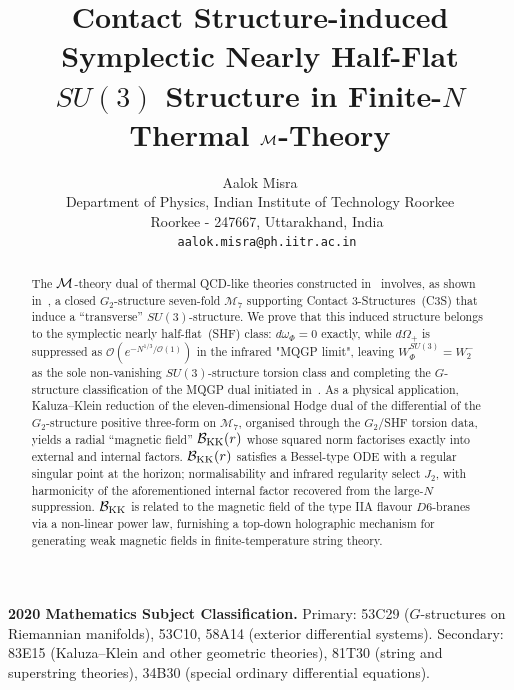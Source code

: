 \documentclass[a4paper,11pt,fleqn]{article}
\theoremstyle{plain}
\theoremstyle{definition}
\begin{document}
\title{Contact Structure-induced Symplectic Nearly Half-Flat $SU(3)$ Structure in Finite-$N$ Thermal ${\cal M}$-Theory}
\author{Aalok Misra\\
Department of Physics, Indian Institute of Technology Roorkee \\
	~~Roorkee - 247667, Uttarakhand, India\\
	~~{\tt aalok.misra@ph.iitr.ac.in}}
\date{}
\maketitle
\noindent

\begin{abstract}
The ${\cal M}$-theory dual of thermal QCD-like theories constructed in~\cite{MQGP,OR4}
involves, as shown in~\cite{ACMS}, a closed $G_2$-structure seven-fold $\mathcal{M}_7$
supporting Contact 3-Structures~(C3S) that induce a ``transverse'' $SU(3)$-structure. We prove that this induced structure belongs to the symplectic nearly half-flat~(SHF)
class: $d\omega_\Phi=0$ exactly, while $d\Omega_+$ is suppressed as
$\mathcal{O}(e^{-N^{1/3}/\mathcal{O}(1)})$ in the infrared "MQGP limit",
leaving $W_\Phi^{SU(3)}=W_2^-$ as the sole non-vanishing $SU(3)$-structure
torsion class and completing the $G$-structure classification of the MQGP dual
initiated in~\cite{NPB,ACMS}.
As a physical application, Kaluza--Klein reduction of the eleven-dimensional Hodge dual of the differential of the $G_2$-structure positive three-form on $\mathcal{M}_7$, organised through the $G_2$/SHF torsion data, yields a radial
``magnetic field'' $\mathcal{B}_{\rm KK}(r)$ whose squared norm factorises exactly into external and internal factors.  $\mathcal{B}_{\rm KK}(r)$ satisfies a Bessel-type ODE with a regular singular point at the horizon; normalisability and infrared regularity select $J_2$, with harmonicity of the aforementioned internal factor recovered from the large-$N$ suppression. $\mathcal{B}_{\rm KK}$ is related to the magnetic field of the type IIA flavour $D6$-branes via a non-linear power law, furnishing a top-down holographic mechanism for generating weak magnetic fields in finite-temperature string theory.
\end{abstract}

\textbf{2020 Mathematics Subject Classification.}
Primary: 53C29 ($G$-structures on Riemannian manifolds), 53C10, 58A14 (exterior differential systems).
Secondary: 83E15 (Kaluza--Klein and other geometric theories), 81T30 (string and superstring theories), 34B30 (special ordinary differential equations).
\end{document}
